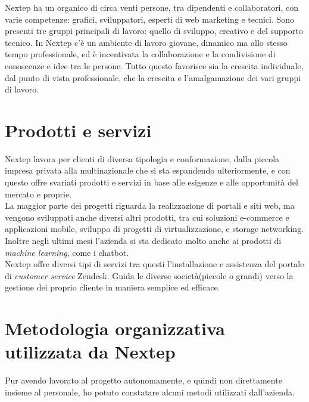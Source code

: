 Nextep ha un organico di circa venti persone, tra dipendenti e collaboratori, con
varie competenze: grafici, sviluppatori, esperti di web marketing e tecnici. Sono presenti
tre gruppi principali di lavoro: quello di sviluppo, creativo e del supporto
tecnico.
In Nextep c’è un ambiente di lavoro giovane, dinamico ma allo stesso tempo professionale,
ed è incentivata la collaborazione e la condivisione di conoscenze e idee
tra le persone. Tutto questo favorisce sia la crescita individuale, dal punto di vista
professionale, che la crescita e l’amalgamazione dei vari gruppi di lavoro.

\section{Prodotti e servizi}
Nextep lavora per clienti di diversa tipologia e conformazione, dalla piccola impresa
privata alla multinazionale che si sta espandendo ulteriormente, e con questo offre
svariati prodotti e servizi in base alle esigenze e alle opportunità del mercato e proprie. 
\\

La maggior parte dei progetti riguarda la realizzazione di portali e siti web, ma vengono
sviluppati anche diversi altri prodotti, tra cui soluzioni e-commerce e applicazioni
mobile, sviluppo di progetti di virtualizzazione, e storage networking. Inoltre negli ultimi mesi l'azienda si sta dedicato molto anche ai prodotti di \emph{machine learning}, come i chatbot. \\

Nextep offre diversi tipi di servizi tra questi l'installazione e assistenza del portale di \emph{customer service} Zendesk. Guida le diverse società(piccole o grandi) verso la gestione dei proprio cliente in maniera semplice ed efficace. 

\section{Metodologia organizzativa utilizzata da Nextep}
Pur avendo lavorato al progetto autonomamente, e quindi non direttamente insieme
al personale, ho potuto constatare alcuni metodi utilizzati
dall’azienda. 
\\
 
